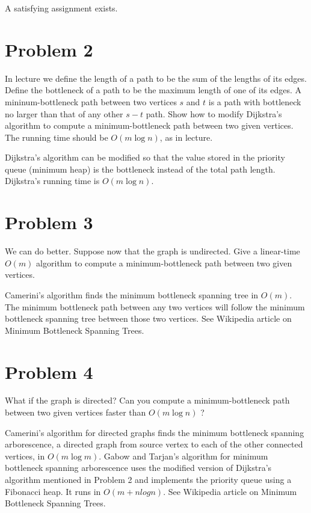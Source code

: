 \documentclass[10pt]{article}
\begin{document}
A satisfying assignment exists.

\section*{\normalsize Problem 2}

In lecture we define the length of a path to be the sum of the lengths of its edges. Define the bottleneck of a path to be the maximum length of one of its edges. A mininum-bottleneck path between two vertices $s$ and $t$ is a path with bottleneck no larger than that of any other $s-t$ path. Show how to modify Dijkstra's algorithm to compute a minimum-bottleneck path between two given vertices. The running time should be $O(m \log ⁡n)$, as in lecture.
\bigskip

Dijkstra's algorithm can be modified so that the value stored in the priority queue (minimum heap) is the bottleneck instead of the total path length. Dijkstra's running time is $O(m \log n)$.

\section*{\normalsize Problem 3}

We can do better. Suppose now that the graph is undirected. Give a linear-time $O(m)$ algorithm to compute a minimum-bottleneck path between two given vertices.
\bigskip

Camerini's algorithm finds the minimum bottleneck spanning tree in $O(m)$. The minimum bottleneck path between any two vertices will follow the minimum bottleneck spanning tree between those two vertices. See Wikipedia article on Minimum Bottleneck Spanning Trees.

\section*{\normalsize Problem 4}

What if the graph is directed? Can you compute a minimum-bottleneck path between two given vertices faster than $O(m \log n)$ ?
\bigskip

Camerini's algorithm for directed graphs finds the minimum bottleneck spanning arborescence, a directed graph from source vertex to each of the other connected vertices, in $O(m \log m)$. Gabow and Tarjan's algorithm for minimum bottleneck spanning arborescence uses the modified version of Dijkstra's algorithm mentioned in Problem 2 and implements the priority queue using a Fibonacci heap. It runs in $O(m + n log n)$. See Wikipedia article on Minimum Bottleneck Spanning Trees.
\end{document}
